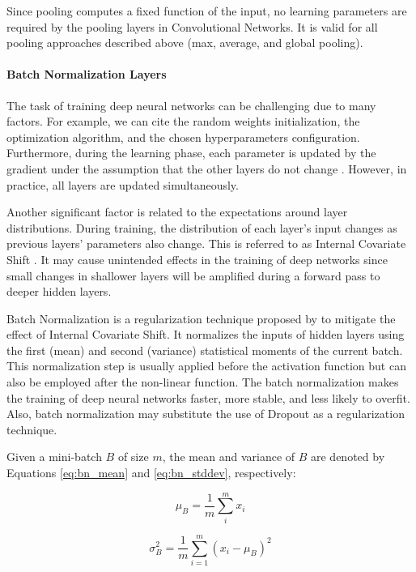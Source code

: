Since pooling computes a fixed function of the input, no learning parameters are required by the pooling layers in Convolutional Networks. It is valid for all pooling approaches described above (max, average, and global pooling).

\paragraph{Batch Normalization Layers}

The task of training deep neural networks can be challenging due to many factors. For example, we can cite the random weights initialization, the optimization algorithm, and the chosen hyperparameters configuration. Furthermore, during the learning phase, each parameter is updated by the gradient under the assumption that the other layers do not change \citep{goodfellow2016deep}. However, in practice, all layers are updated simultaneously.

Another significant factor is related to the expectations around layer distributions. During training, the distribution of each layer's input changes as previous layers' parameters also change. This is referred to as Internal Covariate Shift \citep{ioffe2015batch}. It may cause unintended effects in the training of deep networks since small changes in shallower layers will be amplified during a forward pass to deeper hidden layers.

Batch Normalization is a regularization technique proposed by \cite{ioffe2015batch} to mitigate the effect of Internal Covariate Shift. It normalizes the inputs of hidden layers using the first (mean) and second (variance) statistical moments of the current batch. This normalization step is usually applied before the activation function but can also be employed after the non-linear function. The batch normalization makes the training of deep neural networks faster, more stable, and less likely to overfit. Also, batch normalization may substitute the use of Dropout as a regularization technique.

Given a mini-batch $B$ of size $m$, the mean and variance of $B$ are denoted by Equations \ref{eq:bn_mean} and \ref{eq:bn_stddev}, respectively:

\begin{equation}
\label{eq:bn_mean}
\mu_B = \frac{1}{m} \sum_{i}^{m} x_i
\end{equation}

\begin{equation}
\label{eq:bn_stddev}
\sigma_B^2 = \frac{1}{m} \sum_{i=1}^{m} (x_i - \mu_B)^{2}
\end{equation}

